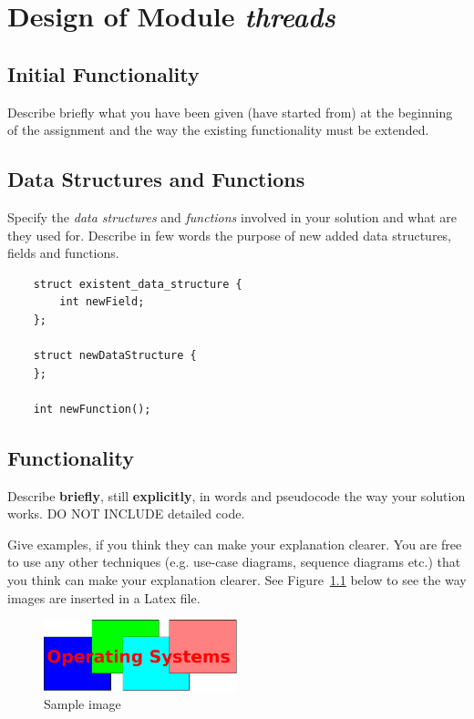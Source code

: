 
\chapter{Design of Module \textit{threads}}


\section{Initial Functionality}

Describe briefly what you have been given (have started from) at the beginning of the assignment and the way the existing functionality must be extended.

\section{Data Structures and Functions}

Specify the \textit{data structures} and \textit{functions} involved in your solution and what are they used for. Describe in few words the purpose of new added data structures, fields and functions. 

\begin{lstlisting}
	struct existent_data_structure {
		int newField;
	};
	
	struct newDataStructure {
	};
	
	int newFunction();
\end{lstlisting}


\section{Functionality}

Describe \textbf{briefly}, still \textbf{explicitly}, in words and pseudocode the way your solution works. DO NOT INCLUDE detailed code. 

Give examples, if you think they can make your explanation clearer. You are free to use any other techniques (e.g. use-case diagrams, sequence diagrams etc.) that you think can make your explanation clearer. See Figure~\ref{fig:sample-image} below to see the way images are inserted in a Latex file. 

\begin{figure}[h]
	\centering
	\includegraphics[width=0.5\textwidth]{figures/sample-image.pdf}
	\caption{Sample image}
	\label{fig:sample-image}
\end{figure}


